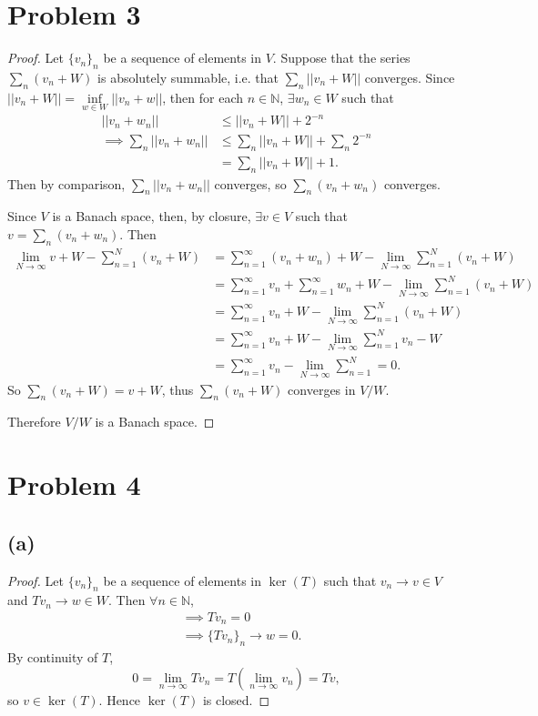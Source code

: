 \documentclass{article}
\begin{document}
\section*{Problem 3}
\begin{proof}
	Let $\{v_n\}_n$ be a sequence of elements in $V$. Suppose that the series $\sum_{n}(v_n+W)$ is absolutely summable, i.e. that $\sum_{n}||v_n + W||$ converges. Since $||v_n + W|| = \inf\limits_{w\in W}||v_n + w||$, then for each $n\in \mathbb{N}$, $\exists w_n \in W$ such that 
	\begin{align}
		||v_n + w_n|| &\leq ||v_n + W|| + 2^{-n} \\
		\implies \sum_{n}||v_n + w_n|| &\leq \sum_{n}||v_n + W|| + \sum_{n}2^{-n} \\
		&= \sum_n ||v_n + W|| + 1.
	\end{align}
	Then by comparison, $\sum_n ||v_n + w_n||$ converges, so $\sum_n (v_n + w_n)$ converges.
	
	Since $V$ is a Banach space, then, by closure, $\exists v \in V$ such that \\ $v = \sum_n (v_n + w_n)$. Then
	\begin{align}
		\lim_{N\to\infty} v+ W - \sum_{n=1}^N (v_n + W) &= \sum_{n=1}^{\infty} (v_n + w_n) + W - \lim_{N\to\infty}\sum_{n=1}^N(v_n + W) \\
		&= \sum_{n=1}^{\infty}v_n + \sum_{n=1}^{\infty}w_n + W -\lim_{N\to\infty}\sum_{n=1}^N(v_n + W) \\
		&= \sum_{n=1}^{\infty}v_n + W -\lim_{N\to\infty}\sum_{n=1}^{N}(v_n + W) \\
		&= \sum_{n=1}^{\infty}v_n + W -\lim_{N\to\infty}\sum_{n=1}^{N} v_n - W \\
		&= \sum_{n=1}^{\infty}v_n - \lim_{N\to\infty}\sum_{n=1}^{N} = 0.
	\end{align}
	So $\sum_n (v_n + W) = v+W$, thus $\sum_n (v_n + W)$ converges in $V/W$.
	
	Therefore $V/W$ is a Banach space.
\end{proof}

\section*{Problem 4}
\subsection*{(a)}
\begin{proof}
	Let $\{v_n\}_n$ be a sequence of elements in $\ker{(T)}$ such that $v_n \rightarrow v \in V$ and $Tv_n \rightarrow w \in W$. Then $\forall n \in \mathbb{N}$,
	\begin{align}
		&\implies Tv_n = 0 \\
		&\implies \{Tv_n\}_n \rightarrow w = 0.
	\end{align}
	By continuity of $T$, 
	\begin{equation}
		0 = \lim_{n\to\infty} Tv_n = T\left(\lim_{n\to\infty}v_n\right) = Tv,
	\end{equation}
	so $v \in \ker{(T)}$. Hence $\ker{(T)}$ is closed.
\end{proof}
\end{document}

